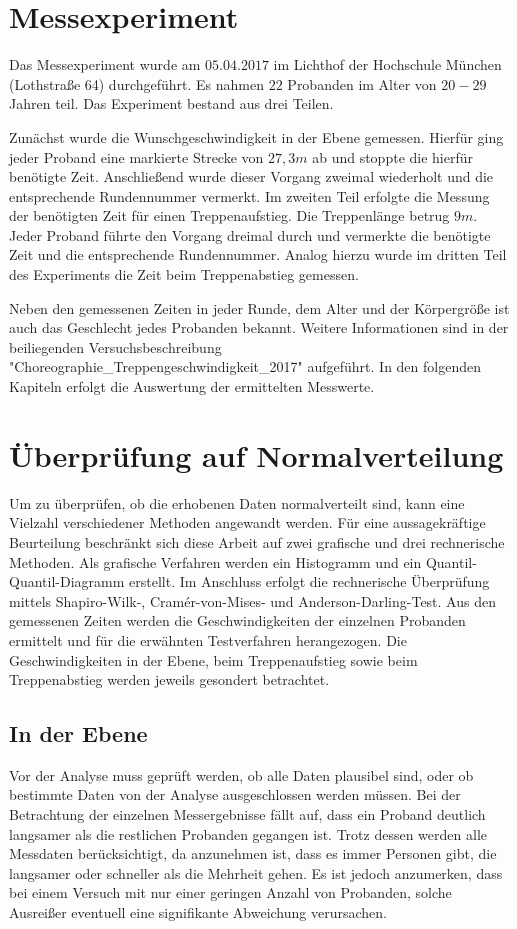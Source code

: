 	\section{Messexperiment}
	
	Das Messexperiment wurde am $05.04.2017$ im Lichthof der Hochschule München (Lothstraße 64) durchgeführt. Es nahmen $22$ Probanden im Alter von $20-29$ Jahren teil. Das Experiment bestand aus drei Teilen. 
	
	Zunächst wurde die Wunschgeschwindigkeit in der Ebene gemessen. Hierfür ging jeder Proband eine markierte Strecke von $27,3m$ ab und stoppte die hierfür benötigte Zeit. Anschließend wurde dieser Vorgang zweimal wiederholt und die entsprechende Rundennummer vermerkt. Im zweiten Teil erfolgte die Messung der benötigten Zeit für einen Treppenaufstieg. Die Treppenlänge betrug $9m$. Jeder Proband führte den Vorgang dreimal durch und vermerkte die benötigte Zeit und die entsprechende Rundennummer. Analog hierzu wurde im dritten Teil des Experiments die Zeit beim Treppenabstieg gemessen. 
	
	Neben den gemessenen Zeiten in jeder Runde, dem Alter und der Körpergröße ist auch das Geschlecht jedes Probanden bekannt. Weitere Informationen sind in der beiliegenden Versuchsbeschreibung "Choreographie\_Treppengeschwindigkeit\_2017" aufgeführt. In den folgenden Kapiteln erfolgt die Auswertung der ermittelten Messwerte.
	
	\section{Überprüfung auf Normalverteilung}
	Um zu überprüfen, ob die erhobenen Daten normalverteilt sind, kann eine Vielzahl verschiedener Methoden angewandt werden. Für eine aussagekräftige Beurteilung beschränkt sich diese Arbeit auf zwei grafische und drei rechnerische Methoden. Als grafische Verfahren werden ein Histogramm und ein Quantil-Quantil-Diagramm erstellt. Im Anschluss erfolgt die rechnerische Überprüfung mittels Shapiro-Wilk-, Cramér-von-Mises- und Anderson-Darling-Test. Aus den gemessenen Zeiten werden die Geschwindigkeiten der einzelnen Probanden ermittelt und für die erwähnten Testverfahren herangezogen. Die Geschwindigkeiten in der Ebene, beim Treppenaufstieg sowie beim Treppenabstieg werden jeweils gesondert betrachtet.
	
	\subsection{In der Ebene}
	Vor der Analyse muss geprüft werden, ob alle Daten plausibel sind, oder ob bestimmte Daten von der Analyse ausgeschlossen werden müssen. Bei der Betrachtung der einzelnen Messergebnisse fällt auf, dass ein Proband deutlich langsamer als die restlichen Probanden gegangen ist. Trotz dessen werden alle Messdaten berücksichtigt, da anzunehmen ist, dass es immer Personen gibt, die langsamer oder schneller als die Mehrheit gehen. Es ist jedoch anzumerken, dass bei einem Versuch mit nur einer geringen Anzahl von Probanden, solche Ausreißer eventuell eine signifikante Abweichung verursachen.
	
